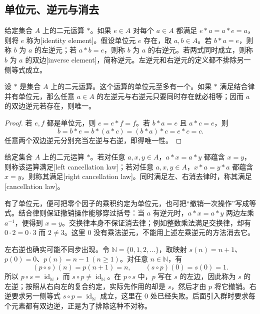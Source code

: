 \subsection{单位元、逆元与消去}
\label{b1:subsec:0101:03}

\begin{definition}\label{b1:def:identity-inverse}
	给定集合 \(A\) 上的二元运算 \(*\)。如果 \(e\in A\) 对每个 \(a\in A\) 都满足 \(e*a=a*e=a\)，则将 \(e\) 称为[identity element]。假设单位元 \(e\) 存在，取 \(a,b\in A\)。若 \(b*a=e\)，则称 \(b\) 为 \(a\) 的左逆元；若 \(a*b=e\)，则称 \(b\) 为 \(a\) 的右逆元。若两式同时成立，则称 \(b\) 为 \(a\) 的双边[inverse element]，简称逆元。左逆元和右逆元的定义都不排除另一侧等式成立。
\end{definition}

\begin{proposition}\label{b1:prop:identity-inverse-unique}
	设 \(*\) 是集合 \(A\) 上的二元运算。这个运算的单位元至多有一个。如果 \(*\) 满足结合律并有单位元，那么任意 \(a\in A\) 的左逆元与右逆元只要同时存在就必相等；因而 \(a\) 的双边逆元若存在，则唯一。
\end{proposition}

\begin{proof}
	若 \(e,f\) 都是单位元，则 \(e=e*f=f\)。若 \(b*a=e\) 且 \(a*c=e\)，则
	\[
		b=b*e=b*(a*c)=(b*a)*c=e*c=c.
	\]
	任意两个双边逆元分别充当左逆与右逆，即得唯一性。
\end{proof}

\begin{definition}\label{b1:def:cancellation}
	给定集合 \(A\) 上的二元运算 \(*\)。若对任意 \(a,x,y\in A\)，\(a*x=a*y\) 都蕴含 \(x=y\)，则称该运算满足[left cancellation law]；若对任意 \(a,x,y\in A\)，\(x*a=y*a\) 都蕴含 \(x=y\)，则称其满足[right cancellation law]。同时满足左、右消去律时，称其满足[cancellation law]。
\end{definition}

有了单位元，便可把零个因子的乘积约定为单位元，也可把“撤销一次操作”写成等式。结合律则保证撤销操作能够穿过括号：当 \(a\) 有逆元时，\(a*x=a*y\) 两边左乘 \(a^{-1}\)，便得到 \(x=y\)。交换律本身不保证消去律；例如整数乘法满足交换律，却有 \(0\cdot2=0\cdot3\) 而 \(2\ne3\)。这里 \(0\) 没有乘法逆元，不能用上述左乘逆元的方法消去它。

\ProseParagraphBreak
左右逆也确实可能不同步出现。令 \(\mathbb N=\{0,1,2,\ldots\}\)，取映射 \(s(n)=n+1\)、\(p(0)=0\)、\(p(n)=n-1\ (n\geq1)\)。对任意 \(n\in\mathbb N\)，有
\[
	(p\circ s)(n)=p(n+1)=n, \qquad (s\circ p)(0)=s(0)=1.
\]
所以 \(p\circ s=\operatorname{id}_{\mathbb N}\)，而 \(s\circ p\ne\operatorname{id}_{\mathbb N}\)。在 \(p\circ s\) 中，\(p\) 写在 \(s\) 的左边，因此称为 \(s\) 的左逆；按照从右向左的复合约定，实际先作用的却是 \(s\)，然后才由 \(p\) 将它撤销。右逆要求另一侧等式 \(s\circ p=\operatorname{id}_{\mathbb N}\) 成立，这里在 \(0\) 处已经失败。后面引入群时要求每个元素都有双边逆，正是为了排除这种不对称。
